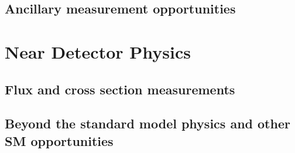 \subsection{Ancillary measurement opportunities}
\section{Near Detector Physics}
\subsection{Flux and cross section measurements}
\subsection{Beyond the standard model physics and other SM opportunities}
